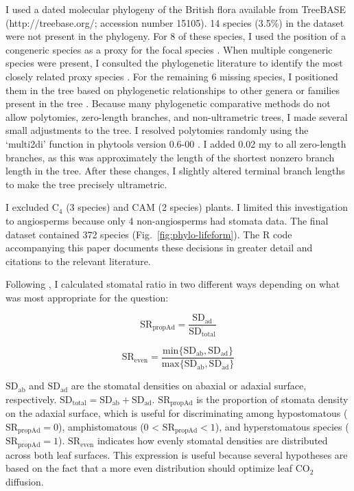\documentclass[12pt, oneside]{article}
\newcommand{\pkg}[1]{{\fontseries{b}\selectfont #1}}
\begin{document}
I used a dated molecular phylogeny of the British flora \citep{Lim_etal_2014} available from TreeBASE (http://treebase.org/; accession number 15105). 14 species (3.5\%) in the dataset were not present in the phylogeny. For 8 of these species, I used the position of a congeneric species as a proxy for the focal species \citep[following][]{Pennell_etal_2016}. When multiple congeneric species were present, I consulted the phylogenetic literature to identify the most closely related proxy species \citep{Scheen_etal_2004, Salmaki_etal_2013}. For the remaining 6 missing species, I positioned them in the tree based on phylogenetic relationships to other genera or families present in the tree \citep{Fior_etal_2006}. Because many phylogenetic comparative methods do not allow polytomies, zero-length branches, and non-ultrametric trees, I made several small adjustments to the tree. I resolved polytomies randomly using the `multi2di' function in \pkg{phytools} version 0.6-00 \citep{Revell_2012}. I added 0.02 my to all zero-length branches, as this was approximately the length of the shortest nonzero branch length in the tree. After these changes, I slightly altered terminal branch lengths to make the tree precisely ultrametric.

I excluded C$_4$ (3 species) and CAM (2 species) plants. I limited this investigation to angiosperms because only 4 non-angiosperms had stomata data. The final dataset contained 372 species (Fig.~\ref{fig:phylo-lifeform}). The R code accompanying this paper documents these decisions in greater detail and citations to the relevant literature.

Following \cite{Muir_2015}, I calculated stomatal ratio in two different ways depending on what was most appropriate for the question: 

\begin{equation} \label{eq:SRpropAd} 
  \mathrm{SR_{propAd}} = \frac{\mathrm{SD_{ad}}}{\mathrm{SD_{total}}}
\end{equation}

\begin{equation} \label{eq:SReven1} 
  \mathrm{SR_{even}} = \frac{\mathrm{min}\{\mathrm{SD_{ab}}, \mathrm{SD_{ad}}\}}{\mathrm{max}\{\mathrm{SD_{ab}}, \mathrm{SD_{ad}}\}}
\end{equation}

$\mathrm{SD_{ab}}$ and $\mathrm{SD_{ad}}$ are the stomatal densities on abaxial or adaxial surface, respectively. $\mathrm{SD_{total}} = \mathrm{SD_{ab}} + \mathrm{SD_{ad}}$. $\mathrm{SR_{propAd}}$ is the proportion of stomata density on the adaxial surface, which is useful for discriminating among hypostomatous ($\mathrm{SR_{propAd}} = 0$), amphistomatous (0 < $\mathrm{SR_{propAd}} < 1$), and hyperstomatous species ($\mathrm{SR_\mathrm{propAd}} = 1$). $\mathrm{SR_\mathrm{even}}$ indicates how evenly stomatal densities are distributed across both leaf surfaces. This expression is useful because several hypotheses are based on the fact that a more even distribution should optimize leaf CO$_2$ diffusion.
\end{document}
